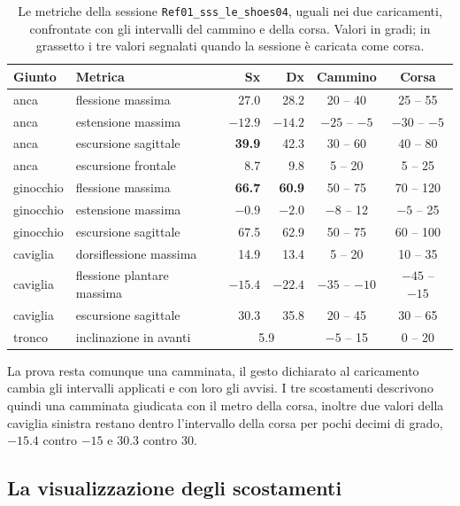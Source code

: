 \begin{table}[htbp]
\centering
\caption{Le metriche della sessione \texttt{Ref01\_sss\_le\_shoes04}, uguali nei
due caricamenti, confrontate con gli intervalli del cammino e della corsa. Valori
in gradi; in grassetto i tre valori segnalati quando la sessione è caricata come
corsa.}
\label{tab:ch4:gesto}
\small
\begin{tabular}{llrrcc}
\toprule
\textbf{Giunto} & \textbf{Metrica} & \textbf{Sx} & \textbf{Dx} &
  \textbf{Cammino} & \textbf{Corsa} \\
\midrule
anca      & flessione massima    & 27.0  & 28.2  & 20 -- 40     & 25 -- 55 \\
anca      & estensione massima   & $-12.9$ & $-14.2$ & $-25$ -- $-5$ & $-30$ -- $-5$ \\
anca      & escursione sagittale & \textbf{39.9} & 42.3 & 30 -- 60 & 40 -- 80 \\
anca      & escursione frontale  & 8.7   & 9.8   & 5 -- 20      & 5 -- 25 \\
ginocchio & flessione massima    & \textbf{66.7} & \textbf{60.9} & 50 -- 75 & 70 -- 120 \\
ginocchio & estensione massima   & $-0.9$ & $-2.0$ & $-8$ -- 12   & $-5$ -- 25 \\
ginocchio & escursione sagittale & 67.5  & 62.9  & 50 -- 75     & 60 -- 100 \\
caviglia  & dorsiflessione massima & 14.9 & 13.4 & 5 -- 20     & 10 -- 35 \\
caviglia  & flessione plantare massima & $-15.4$ & $-22.4$ & $-35$ -- $-10$ & $-45$ -- $-15$ \\
caviglia  & escursione sagittale & 30.3  & 35.8  & 20 -- 45     & 30 -- 65 \\
tronco    & inclinazione in avanti & \multicolumn{2}{c}{5.9} & $-5$ -- 15 & 0 -- 20 \\
\bottomrule
\end{tabular}
\end{table}

La prova resta comunque una camminata, il gesto dichiarato al caricamento cambia
gli intervalli applicati e con loro gli avvisi. I tre scostamenti descrivono
quindi una camminata giudicata con il metro della corsa, inoltre due valori
della caviglia sinistra restano dentro l'intervallo della corsa per pochi decimi
di grado, $-15.4$ contro $-15$ e 30.3 contro 30.

\subsection{La visualizzazione degli scostamenti}
\label{subsec:ch4:demo-rendering}


